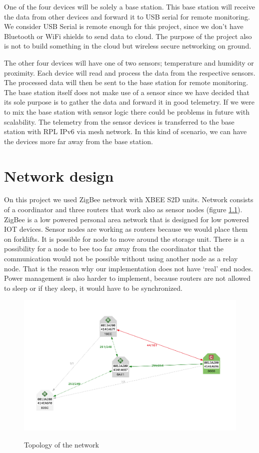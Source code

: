 One of the four devices will be solely a base station. This base station will receive the data from other devices and forward it to USB serial for remote monitoring. We consider USB Serial is remote enough for this project, since we don’t have Bluetooth or WiFi shields to send data to cloud. The purpose of the project also is not to build something in the cloud but wireless secure networking on ground. 

The other four devices will have one of two sensors; temperature and humidity or proximity. Each device will read and process the data from the respective sensors. The processed data will then be sent to the base station for remote monitoring. The base station itself does not make use of a sensor since we have decided that its sole purpose is to gather the data and forward it in good telemetry. If we were to mix the base station with sensor logic there could be problems in future with scalability. 
The telemetry from the sensor devices is transferred to the base station with RPL IPv6 via mesh network. In this kind of scenario, we can have the devices more far away from the base station. 








\chapter{Network design}

On this project we used ZigBee network with XBEE S2D units. Network consists of a coordinator and three routers that work also as sensor nodes (figure \ref{fig:topology}). ZigBee is a low powered personal area network that is designed for low powered IOT devices. 
Sensor nodes are working as routers because we would place them on forklifts. It is possible for node to move around the storage unit. There is a possibility for a node to bee too far away from the coordinator that the communication would not be possible without using another node as a relay node. That is the reason why our implementation does not have ‘real’ end nodes. Power management is also harder to implement, because routers are not allowed to sleep or if they sleep, it would have to be synchronized. 


\begin{figure}[h!]
\caption{Topology of the network}
\includegraphics[width=\textwidth]{network.png}
\label{fig:topology}
\end{figure}
